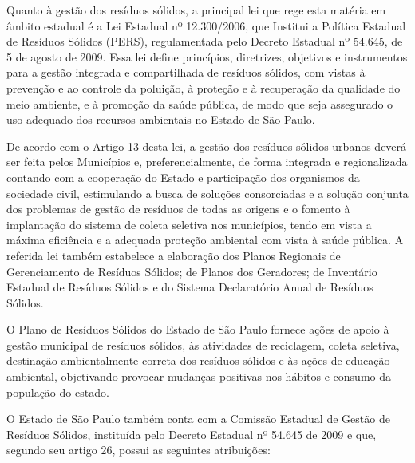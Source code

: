 	Quanto à gestão dos resíduos sólidos, a principal lei que rege esta matéria em âmbito estadual é a Lei Estadual nº 12.300/2006,  que Institui a Política Estadual de Resíduos Sólidos (PERS), regulamentada pelo Decreto Estadual nº 54.645, de 5 de agosto de 2009. Essa lei define princípios, diretrizes, objetivos e instrumentos para a gestão integrada e compartilhada de resíduos sólidos, com vistas à prevenção e ao controle da poluição, à proteção e à recuperação da qualidade do meio ambiente, e à promoção da saúde pública, de modo que seja assegurado o uso adequado dos recursos ambientais no Estado de São Paulo.
	
	De acordo com o Artigo 13 desta lei, a gestão dos resíduos sólidos urbanos deverá ser feita pelos Municípios e, preferencialmente, de forma integrada e regionalizada contando com a cooperação do Estado e participação dos organismos da sociedade civil, estimulando a busca de soluções consorciadas e a solução conjunta dos problemas de gestão de resíduos de todas as origens e o fomento à implantação do sistema de coleta seletiva nos municípios, tendo em vista a máxima eficiência e a adequada proteção ambiental com vista à saúde pública. A referida lei também estabelece a elaboração dos Planos Regionais de Gerenciamento de Resíduos Sólidos; de Planos dos Geradores; de Inventário Estadual de Resíduos Sólidos e do Sistema Declaratório Anual de Resíduos Sólidos.
	
	O Plano de Resíduos Sólidos do Estado de São Paulo fornece ações de apoio à gestão municipal de resíduos sólidos, às atividades de reciclagem, coleta seletiva, destinação ambientalmente correta dos resíduos sólidos e às ações de educação ambiental, objetivando provocar mudanças positivas nos hábitos e consumo da população do estado.
	
	O Estado de São Paulo também conta com a Comissão Estadual de Gestão de Resíduos Sólidos, instituída pelo Decreto Estadual nº 54.645 de 2009 e que, segundo seu artigo 26, possui as seguintes atribuições:
	
	

